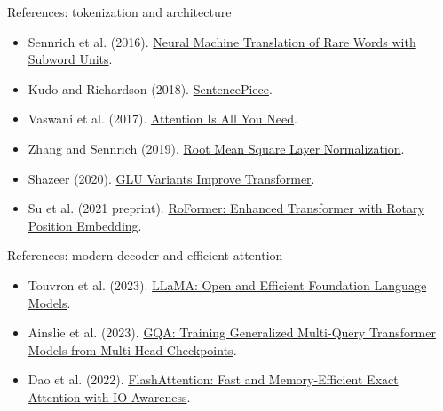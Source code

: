 \documentclass[11pt,aspectratio=169]{beamer}
\begin{document}
\begin{frame}{References: tokenization and architecture}
\small
\begin{itemize}
\item Sennrich et al. (2016). \href{https://arxiv.org/abs/1508.07909}{Neural Machine Translation of Rare Words with Subword Units}.
\item Kudo and Richardson (2018). \href{https://arxiv.org/abs/1808.06226}{SentencePiece}.
\item Vaswani et al. (2017). \href{https://arxiv.org/abs/1706.03762}{Attention Is All You Need}.
\item Zhang and Sennrich (2019). \href{https://arxiv.org/abs/1910.07467}{Root Mean Square Layer Normalization}.
\item Shazeer (2020). \href{https://arxiv.org/abs/2002.05202}{GLU Variants Improve Transformer}.
\item Su et al. (2021 preprint). \href{https://arxiv.org/abs/2104.09864}{RoFormer: Enhanced Transformer with Rotary Position Embedding}.
\end{itemize}
\end{frame}

\begin{frame}{References: modern decoder and efficient attention}
\small
\begin{itemize}
\item Touvron et al. (2023). \href{https://arxiv.org/abs/2302.13971}{LLaMA: Open and Efficient Foundation Language Models}.
\item Ainslie et al. (2023). \href{https://arxiv.org/abs/2305.13245}{GQA: Training Generalized Multi-Query Transformer Models from Multi-Head Checkpoints}.
\item Dao et al. (2022). \href{https://arxiv.org/abs/2205.14135}{FlashAttention: Fast and Memory-Efficient Exact Attention with IO-Awareness}.
\end{itemize}
\end{frame}
\end{document}

